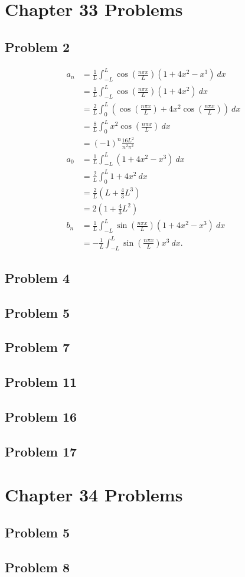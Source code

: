 \documentclass[10pt]{mypackage}
\begin{document}
\RaggedRight
\section{Chapter 33 Problems}%
\subsection{Problem 2}%
\begin{align*}
  a_n &= \frac{1}{L}\int_{-L}^{L} \cos\left(\frac{n\pi x}{L}\right)\left(1 + 4x^2 - x^3\right)\:dx\\
      &= \frac{1}{L}\int_{-L}^{L} \cos\left(\frac{n\pi x}{L}\right)\left(1 + 4x^2\right)\:dx\\
      &= \frac{2}{L}\int_{0}^{L} \left(\cos\left(\frac{n\pi x}{L}\right) + 4x^2\cos\left(\frac{n\pi x}{L}\right)\right)\:dx\\
      &= \frac{8}{L}\int_{0}^{L}x^2\cos\left(\frac{n\pi x}{L}\right) \:dx\\
      &= \left(-1\right)^n\frac{16L^2}{n^2\pi^2}\\
  a_0 &= \frac{1}{L}\int_{-L}^{L} \left(1 + 4x^2 - x^3\right)\:dx\\
      &= \frac{2}{L}\int_{0}^{L} 1 + 4x^2\:dx\\
      &= \frac{2}{L}\left(L + \frac{4}{3}L^3\right)\\
      &= 2\left(1 + \frac{4}{3}L^2\right)\\
  b_n &= \frac{1}{L}\int_{-L}^{L} \sin\left(\frac{n\pi x}{L}\right)\left(1 + 4x^2 - x^3\right)\:dx\\
      &= -\frac{1}{L}\int_{-L}^{L} \sin\left(\frac{n\pi x}{L}\right)x^3\:dx.
\end{align*}

\subsection{Problem 4}%
\subsection{Problem 5}%
\subsection{Problem 7}%
\subsection{Problem 11}%
\subsection{Problem 16}%
\subsection{Problem 17}%
\section{Chapter 34 Problems}%
\subsection{Problem 5}%
\subsection{Problem 8}%
\end{document}
